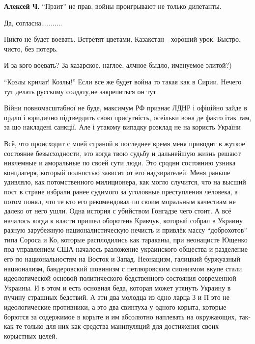 \begin{itemize}
\textbf{Алексей Ч.} \enquote{Прзит} не прав, войны проигрывают не только дилетанты.

Да, согласна...........

Никто не будет воевать. Встретят цветами. Казакстан - хороший урок. Быстро, чисто, без потерь.

И за кого воевать? За хазарское, наглое, алчное быдло, именуемое элитой?)

\enquote{Козлы кричат! Козлы!} Если все же будет война то такая как в Сирии. Нечего тут делать русскому солдату,не закрепиться он тут.


Війни повномасштабної не буде, максимум РФ признає ЛДНР і офіційно зайде в
ордло і юридично підтвердить свою присутність, осеільки вона де факто ітак там,
за що накладені санкції. Але і утакому випадку розклад не на користь України


Всё, что происходит с моей страной в последнее время меня приводит в жуткое
состояние безысходности, это когда твою судьбу и дальнейшую жизнь решают
никчемные и аморальные по своей сути люди. Это сродни состоянию узника
концлагеря, который полностью зависит от его надзирателей. Меня раньше
удивляло, как потомственного милиционера, как могло случится, что на высший
пост в стране избрали ранее судимого за уголовные преступления человека, а
потом понял, что те кто его рекомендовал по своим моральным качествам не далеко
от него ушли. Одна история с убийством Гонгадзе чего стоит. А всё началось
когда к власти пришел оборотень Кравчук, который собрал в Украину разную
зарубежную националистическую нечисть и привлёк массу \enquote{доброхотов} типа Сороса
и Ко, которые расплодились как тараканы, при неонацисте Ющенко под управлением
США началось разложение украинского общества и разделение его по
национальностям на Восток и Запад. Неонацизм, галицкий буржуазный национализм,
бандеровский шовинизм с петлюровским сионизмом вкупе стали идеологической
основой политического бедственного состояния современной Украины. И в этом и
есть основная беда, которая может утянуть Украину в пучину страшных бедствий. А
эти два молодца из одно ларца З и П это не идеологические противники, а это два
свинтуха у одного корыта, которые борются за содержимое в корыте и им абсолютно
наплевать на окружающих, так-как те только для них как средства манипуляций для
достижения своих корыстных целей.

\end{itemize} %
